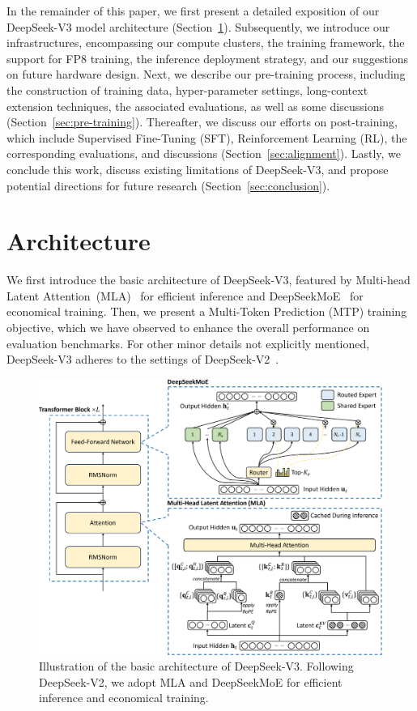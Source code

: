 \documentclass[11pt, a4paper, logo, copyright, nonumbering]{deepseek}
\newcommand{\dsvii}{DeepSeek-V2}
\newcommand{\dsattn}{MLA}
\newcommand{\dsmoe}{DeepSeekMoE}
\newcommand{\dsviii}{DeepSeek-V3}
\begin{document}
\begin{CJK*}{UTF8}{gbsn}
In the remainder of this paper, we first present a detailed exposition of our \dsviii{} model architecture (Section~\ref{sec:arch}). 
Subsequently, we introduce our infrastructures, encompassing our compute clusters, the training framework, the support for FP8 training, the inference deployment strategy, and our suggestions on future hardware design.
Next, we describe our pre-training process, including the construction of training data, hyper-parameter settings, long-context extension techniques, the associated evaluations, as well as some discussions (Section~\ref{sec:pre-training}). 
Thereafter, we discuss our efforts on post-training, which include Supervised Fine-Tuning (SFT), Reinforcement Learning (RL), the corresponding evaluations, and discussions (Section~\ref{sec:alignment}). 
Lastly, we conclude this work, discuss existing limitations of \dsviii{}, and propose potential directions for future research (Section~\ref{sec:conclusion}).

\section{Architecture}
\label{sec:arch}

We first introduce the basic architecture of \dsviii{}, featured by Multi-head Latent Attention~(\dsattn{})~\citep{dsvii} for efficient inference and \dsmoe{}~\citep{deepseekmoe} for economical training.
Then, we present a Multi-Token Prediction (MTP) training objective, which we have observed to enhance the overall performance on evaluation benchmarks.
For other minor details not explicitly mentioned, \dsviii{} adheres to the settings of \dsvii{}~\citep{dsvii}. 

\begin{figure}[!t]
\centering
\includegraphics[width=0.99\linewidth]{figures/basic_arch.pdf}
\caption{
    Illustration of the basic architecture of \dsviii{}. 
    Following \dsvii{}, we adopt \dsattn{} and \dsmoe{} for efficient inference and economical training.
}
\label{fig:basic_arch}
\end{figure}


\end{CJK*}
\end{document}
